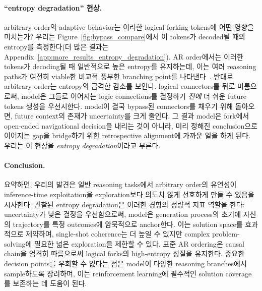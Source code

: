 \paragraph{``entropy degradation'' 현상.}
arbitrary order의 adaptive behavior는 이러한 logical forking tokens에 어떤 영향을 미치는가?
우리는 Figure~\ref{fig:bypass_compare}에서 이 tokens가 decoded될 때의 entropy를 측정한다(더 많은 결과는 Appendix~\ref{app:more_results_entropy_degradation}).
AR order에서는 이러한 tokens가 decoding될 때 일반적으로 높은 entropy를 유지하는데, 이는 여러 reasoning paths가 여전히 viable한 비교적 풍부한 branching point를 나타낸다~\cite{wang2025beyond}.
반대로 arbitrary order는 entropy의 급격한 감소를 보인다.
logical connectors를 뒤로 미룸으로써, model은 그들로 이어지는 logic connections를 결정하기 \emph{전에} 더 쉬운 future tokens 생성을 우선시한다.
model이 결국 bypass된 connectors를 채우기 위해 돌아오면, future context의 존재가 uncertainty를 크게 줄인다.
그 결과 model은 fork에서 open-ended navigational decision을 내리는 것이 아니라, 미리 정해진 conclusion으로 이어지는 gap을 bridge하기 위한 retrospective alignment에 가까운 일을 하게 된다.
우리는 이 현상을 \emph{entropy degradation}이라고 부른다.

\paragraph{Conclusion.}
요약하면, 우리의 발견은 일반 reasoning tasks에서 arbitrary order의 유연성이 inference-time exploitation을 exploration보다 의도치 않게 선호하게 만들 수 있음을 시사한다.
관찰된 entropy degradation은 이러한 경향의 정량적 지표 역할을 한다: uncertainty가 낮은 결정을 우선함으로써, model은 generation process의 초기에 자신의 trajectory를 특정 outcomes에 암묵적으로 anchor한다.
이는 solution space를 효과적으로 제약하여, single-shot coherence는 더 높일 수 있지만 complex problem-solving에 필요한 넓은 exploration을 제한할 수 있다.
표준 AR ordering은 causal chain을 엄격히 따름으로써 logical forks의 high-entropy 성질을 유지한다.
중요한 decision points를 우회할 수 없다는 점은 model이 다양한 reasoning branches에서 sample하도록 장려하며, 이는 reinforcement learning에 필수적인 solution coverage를 보존하는 데 도움이 된다.
